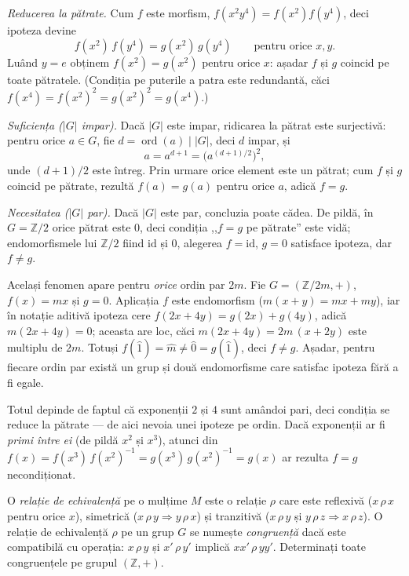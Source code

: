 \begin{solutie}
\textit{Reducerea la pătrate.} Cum $f$ este morfism,
$f(x^{2}y^{4})=f(x^{2})f(y^{4})$, deci ipoteza devine
\[
  f(x^{2})\,f(y^{4}) = g(x^{2})\,g(y^{4}) \qquad \text{pentru orice } x,y.
\]
Luând $y=e$ obținem $f(x^{2})=g(x^{2})$ pentru orice $x$: așadar
$f$ și $g$ coincid pe toate pătratele. (Condiția pe puterile a
patra este redundantă, căci $f(x^{4})=f(x^{2})^{2}=g(x^{2})^{2}=g(x^{4})$.)

\smallskip
\textit{Suficiența ($|G|$ impar).} Dacă $|G|$ este impar, ridicarea
la pătrat este surjectivă: pentru orice $a\in G$, fie
$d=\operatorname{ord}(a)\mid|G|$, deci $d$ impar, și
\[
  a = a^{d+1} = \bigl(a^{(d+1)/2}\bigr)^{2},
\]
unde $(d+1)/2$ este întreg. Prin urmare orice element este un pătrat;
cum $f$ și $g$ coincid pe pătrate, rezultă $f(a)=g(a)$ pentru
orice $a$, adică $f=g$.

\smallskip
\textit{Necesitatea ($|G|$ par).} Dacă $|G|$ este par, concluzia poate
cădea. De pildă, în $G=\mathbb{Z}/2$ orice pătrat este $0$,
deci condiția ,,$f=g$ pe pătrate'' este vidă; endomorfismele
lui $\mathbb{Z}/2$ fiind $\mathrm{id}$ și $0$, alegerea $f=\mathrm{id}$,
$g=0$ satisface ipoteza, dar $f\neq g$.

Același fenomen apare pentru \emph{orice} ordin par $2m$. Fie
$G=(\mathbb{Z}/2m,+)$, $f(x)=mx$ și $g=0$. Aplicația $f$ este
endomorfism ($m(x+y)=mx+my$), iar în notație aditivă ipoteza cere
$f(2x+4y)=g(2x)+g(4y)$, adică $m(2x+4y)=0$; aceasta are loc, căci
$m(2x+4y)=2m\,(x+2y)$ este multiplu de $2m$. Totuși
$f(\widehat 1)=\widehat m\neq\widehat 0=g(\widehat 1)$, deci $f\neq g$.
Așadar, pentru fiecare ordin par există un grup și două endomorfisme
care satisfac ipoteza fără a fi egale.
\end{solutie}

\begin{obs}
Totul depinde de faptul că exponenții $2$ și $4$ sunt
amândoi pari, deci condiția se reduce la pătrate --- de aici
nevoia unei ipoteze pe ordin. Dacă exponenții ar fi \emph{primi
între ei} (de pildă $x^{2}$ și $x^{3}$), atunci din
$f(x)=f(x^{3})\,f(x^{2})^{-1}=g(x^{3})\,g(x^{2})^{-1}=g(x)$ ar rezulta
$f=g$ necondiționat.
\end{obs}

\begin{problema}
O \emph{relație de echivalență} pe o mulțime $M$ este o
relație $\rho$ care este reflexivă ($x\,\rho\,x$ pentru orice $x$),
simetrică ($x\,\rho\,y\Rightarrow y\,\rho\,x$) și tranzitivă
($x\,\rho\,y$ și $y\,\rho\,z\Rightarrow x\,\rho\,z$). O relație de
echivalență $\rho$ pe un grup $G$ se numește \emph{congruență}
dacă este compatibilă cu operația: $x\,\rho\,y$ și
$x'\,\rho\,y'$ implică $xx'\,\rho\,yy'$. Determinați toate
congruențele pe grupul $(\mathbb{Z},+)$.
\end{problema}

